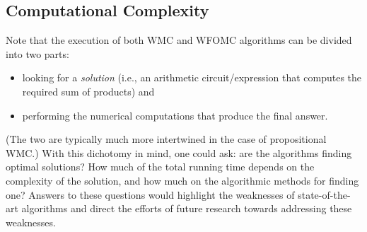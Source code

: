 
\subsection{Computational Complexity}

Note that the execution of both WMC and WFOMC algorithms can be divided into two
parts:
\begin{itemize}
  \item looking for a \emph{solution} (i.e., an arithmetic circuit/expression
        that computes the required sum of products) and
  \item performing the numerical computations that produce the final answer.
\end{itemize}
(The two are typically much more intertwined in the case of propositional WMC.)
With this dichotomy in mind, one could ask: are the algorithms finding optimal
solutions? How much of the total running time depends on the complexity of the
solution, and how much on the algorithmic methods for finding one? Answers to
these questions would highlight the weaknesses of state-of-the-art algorithms
and direct the efforts of future research towards addressing these weaknesses.

